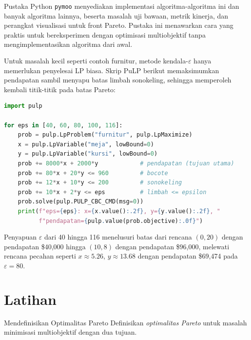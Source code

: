 Pustaka Python \texttt{pymoo} menyediakan implementasi algoritma-algoritma ini dan banyak algoritma lainnya, beserta masalah uji bawaan, metrik kinerja, dan perangkat visualisasi untuk front Pareto. Pustaka ini menawarkan cara yang praktis untuk bereksperimen dengan optimisasi multiobjektif tanpa mengimplementasikan algoritma dari awal.

Untuk masalah kecil seperti contoh furnitur, metode kendala-$\varepsilon$ hanya memerlukan penyelesai LP biasa. Skrip PuLP berikut memaksimumkan pendapatan sambil menyapu batas limbah sonokeling, sehingga memperoleh kembali titik-titik pada batas Pareto:

\begin{lstlisting}[language=Python]
import pulp

for eps in [40, 60, 80, 100, 116]:
    prob = pulp.LpProblem("furnitur", pulp.LpMaximize)
    x = pulp.LpVariable("meja", lowBound=0)
    y = pulp.LpVariable("kursi", lowBound=0)
    prob += 8000*x + 2000*y            # pendapatan (tujuan utama)
    prob += 80*x + 20*y <= 960         # bocote
    prob += 12*x + 10*y <= 200         # sonokeling
    prob += 10*x + 2*y <= eps          # limbah <= epsilon
    prob.solve(pulp.PULP_CBC_CMD(msg=0))
    print(f"eps={eps}: x={x.value():.2f}, y={y.value():.2f}, "
          f"pendapatan={pulp.value(prob.objective):.0f}")
\end{lstlisting}

Penyapuan $\varepsilon$ dari 40 hingga 116 menelusuri batas dari rencana $(0,20)$ dengan pendapatan \$40{,}000 hingga $(10,8)$ dengan pendapatan \$96{,}000, melewati rencana pecahan seperti $x \approx 5.26$, $y \approx 13.68$ dengan pendapatan \$69{,}474 pada $\varepsilon = 80$.

\section{Latihan}


\begin{ex}{Mendefinisikan Optimalitas Pareto}{}
\label{ex:pareto-def}
Definisikan \emph{optimalitas Pareto} untuk masalah minimisasi multiobjektif dengan dua tujuan.
\end{ex}

